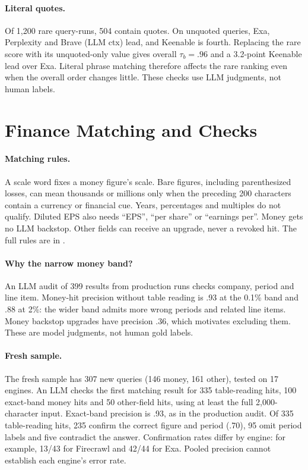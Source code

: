 \documentclass[11pt]{article}
\begin{document}
\paragraph{Literal quotes.}
Of 1,200 rare query-runs, 504 contain quotes. On unquoted queries,
Exa, Perplexity and Brave (LLM ctx) lead, and Keenable is fourth.
Replacing the rare score with its unquoted-only value gives overall
$\tau_b=.96$ and a 3.2-point Keenable lead over Exa. Literal phrase
matching therefore affects the rare ranking even when the overall order
changes little. These checks use LLM judgments, not human labels.

\section{Finance Matching and Checks}
\label{app:finance}

\paragraph{Matching rules.}
A scale word fixes a money figure's scale. Bare figures,
including parenthesized losses, can mean thousands or millions only when
the preceding 200 characters contain a currency or financial cue. Years,
percentages and multiples do not qualify. Diluted EPS also needs
``EPS'', ``per share'' or ``earnings per''. Money gets no LLM backstop.
Other fields can receive an upgrade, never a revoked hit. The full rules
are in .

\paragraph{Why the narrow money band?}
An LLM audit of 399 results from production runs checks company, period
and line item.
Money-hit precision without table reading is .93 at the 0.1\% band and
.88 at 2\%: the wider band admits more wrong periods and related line
items. Money backstop upgrades have precision .36, which motivates
excluding them. These are model judgments, not human gold labels.

\paragraph{Fresh sample.}
The fresh sample has 307 new queries (146 money, 161 other), tested on
17 engines. An LLM checks the first matching result for 335
table-reading hits, 100 exact-band money hits and 50 other-field hits,
using at least the full 2,000-character input. Exact-band precision is .93, as in the production audit.
Of 335 table-reading hits, 235 confirm the correct figure and period
(.70), 95 omit period labels and five contradict the answer.
Confirmation rates differ by engine: for
example, 13/43 for Firecrawl and 42/44 for Exa. Pooled precision cannot
establish each engine's error rate.
\end{document}
